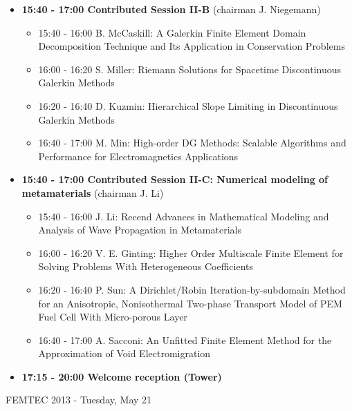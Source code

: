 \documentclass[10pt, A4]{article}%
\begin{document}
\begin{itemize}
  \item {\bf 15:40 - 17:00 Contributed Session II-B} (chairman J. Niegemann) 
  \begin{itemize}
    \item 15:40 - 16:00 {B. McCaskill}: {A Galerkin Finite Element Domain Decomposition Technique and Its Application in Conservation Problems}
    \item 16:00 - 16:20 {S. Miller}: {Riemann Solutions for Spacetime Discontinuous Galerkin Methods}
    \item 16:20 - 16:40 {D. Kuzmin}: {Hierarchical Slope Limiting in Discontinuous Galerkin Methods}
    \item 16:40 - 17:00 {M. Min}: {High-order DG Methods: Scalable Algorithms and Performance for Electromagnetics Applications}
  \end{itemize}
    \item {\bf 15:40 - 17:00 Contributed Session II-C: Numerical modeling of metamaterials} (chairman J. Li) 
  \begin{itemize}
    \item 15:40 - 16:00 {J. Li}: {Recend Advances in Mathematical Modeling and Analysis of Wave Propagation in Metamaterials} %
    \item 16:00 - 16:20 {V. E. Ginting}: {Higher Order Multiscale Finite Element for Solving Problems With Heterogeneous Coefficients}
    \item 16:20 - 16:40 {P. Sun}: A Dirichlet/Robin Iteration-by-subdomain Method for an Anisotropic, Nonisothermal Two-phase Transport Model of PEM Fuel Cell With Micro-porous Layer
    \item 16:40 - 17:00 {A. Sacconi}: {An Unfitted Finite Element Method for the Approximation of Void Electromigration}
  \end{itemize}    
  \item {\bf 17:15 - 20:00 Welcome reception (Tower)} 
\end{itemize}

\newpage

\centerline{\huge FEMTEC 2013 - Tuesday, May 21}
\vspace{4mm}
\end{document}
